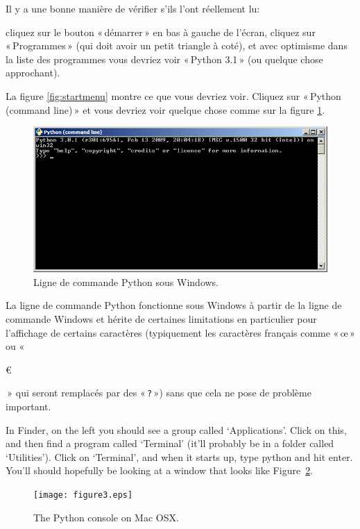 Il y a une bonne manière de vérifier s'ils l'ont réellement lu: 
\begin{WINDOWS}
cliquez sur le bouton « démarrer » en bas à gauche de l'écran, cliquez sur « Programmes » (qui doit avoir un petit triangle à coté), et avec optimisme dans la liste des programmes vous devriez voir « Python 3.1 » (ou quelque chose approchant).
 
La figure \ref{fig:startmenu} montre ce que vous devriez voir. Cliquez sur « Python (command line) » et vous devriez voir quelque chose comme sur la figure \ref{fig:pycl}.

\begin{figure}[!ht]
\centering
\includegraphics[scale=0.6]{images/pycl}
\caption{Ligne de commande Python sous Windows.}\label{fig:pycl}
\end{figure}

La ligne de commande Python fonctionne sous Windows à partir de la ligne de commande Windows et hérite de certaines limitations en particulier pour l'affichage de certains caractères (typiquement les caractères français comme « œ » ou  « \begin{small}\euro\end{small} » qui seront remplacés par des « \texttt{?} ») sans que cela ne pose de problème important.

\end{WINDOWS}

\begin{MAC}
In Finder, on the left you should see a group called `Applications'.  Click on this, and then find a program called `Terminal' (it'll probably be in a folder called `Utilities').
Click on `Terminal', and when it starts up, type python and hit enter.  You'll should hopefully be looking at a window that looks like Figure~\ref{fig3}.

\begin{figure}
\begin{center}
\texttt{[image: figure3.eps]}
\end{center}
\caption{The Python console on Mac OSX.}\label{fig3}
\end{figure}
\end{MAC}


